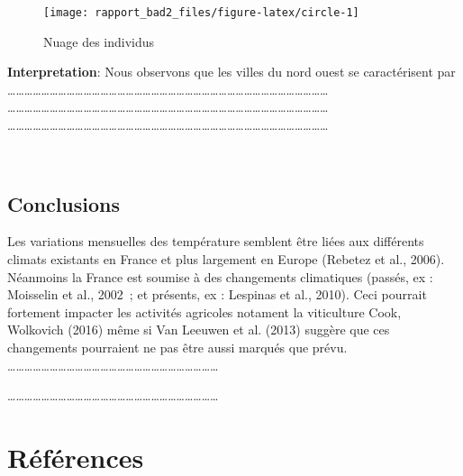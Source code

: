 \documentclass[
]{article}
\begin{document}
\begin{figure}[h]

{\centering \texttt{[image: rapport\_bad2\_files/figure-latex/circle-1]} 

}

\caption{Nuage des individus}\label{fig:circle}
\end{figure}

\textbf{Interpretation}: Nous observons que les villes du nord ouest se
caractérisent par\\
\ldots\ldots\ldots\ldots\ldots\ldots\ldots\ldots\ldots\ldots\ldots\ldots\ldots\ldots\ldots\ldots\ldots\ldots\ldots\ldots\ldots\ldots\ldots\ldots\ldots\ldots\ldots\ldots\ldots\ldots\ldots\ldots\ldots\ldots\ldots\ldots\ldots\ldots{}
\ldots\ldots\ldots\ldots\ldots\ldots\ldots\ldots\ldots\ldots\ldots\ldots\ldots\ldots\ldots\ldots\ldots\ldots\ldots\ldots\ldots\ldots\ldots\ldots\ldots\ldots\ldots\ldots\ldots\ldots\ldots\ldots\ldots\ldots\ldots\ldots\ldots\ldots{}
\ldots\ldots\ldots\ldots\ldots\ldots\ldots\ldots\ldots\ldots\ldots\ldots\ldots\ldots\ldots\ldots\ldots\ldots\ldots\ldots\ldots\ldots\ldots\ldots\ldots\ldots\ldots\ldots\ldots\ldots\ldots\ldots\ldots\ldots\ldots\ldots\ldots\ldots{}

~

\hypertarget{conclusions}{%
\subsection{\texorpdfstring{\textbf{Conclusions
}}{Conclusions }}\label{conclusions}}

Les variations mensuelles des température semblent être liées aux
différents climats existants en France et plus largement en Europe
(Rebetez et al., 2006). Néanmoins la France est soumise à des
changements climatiques (passés, ex : Moisselin et al., 2002~; et
présents, ex : Lespinas et al., 2010). Ceci pourrait fortement impacter
les activités agricoles notament la viticulture Cook, Wolkovich (2016)
même si Van Leeuwen et al. (2013) suggère que ces changements pourraient
ne pas être aussi marqués que prévu.
\ldots\ldots\ldots\ldots\ldots\ldots\ldots\ldots\ldots\ldots\ldots\ldots\ldots\ldots\ldots\ldots\ldots\ldots\ldots\ldots\ldots\ldots\ldots\ldots\ldots{}

\ldots\ldots\ldots\ldots\ldots\ldots\ldots\ldots\ldots\ldots\ldots\ldots\ldots\ldots\ldots\ldots\ldots\ldots\ldots\ldots\ldots\ldots\ldots\ldots\ldots{}

\hypertarget{ruxe9fuxe9rences}{%
\section{\texorpdfstring{\textbf{Références}}{Références}}\label{ruxe9fuxe9rences}}
\end{document}
